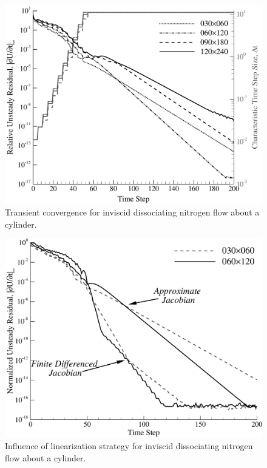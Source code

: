 \begin{figure}
  \includegraphics[width=\textwidth]{figures/hornung_N2_cylinder/conv}
  \caption{Transient convergence for inviscid dissociating nitrogen flow about a cylinder.\label{fig:hornung_conv}}
\end{figure}


\begin{figure}
  \includegraphics[width=\textwidth]{figures/hornung_N2_cylinder/approx_vs_fd_jacobian}
  \caption{Influence of linearization strategy for inviscid dissociating nitrogen flow about a cylinder.\label{fig:hornung_jac_comp_conv}}
\end{figure}




